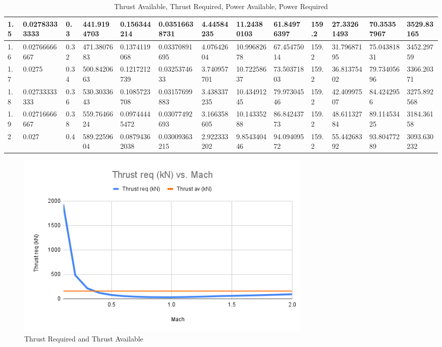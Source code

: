 \documentclass[12pt]{report}
\begin{document}
\begin{table}[H]
{\begin{tabular}{|l|l|l|l|l|l|l|l|l|l|l|l|l|}
1.5 & 0.02783333333 & 0.3  & 441.9194703 & 0.156344214   & 0.03516638731 & 4.44584235   & 11.24380103   & 61.84976397 & 159.2 & 27.33261493 & 70.35357967 & 3529.83165  \\ \hline
1.6 & 0.02766666667 & 0.32 & 471.3807683 & 0.1374119068  & 0.03370891695 & 4.07642604   & 10.99682678   & 67.45475014 & 159.2 & 31.79687195 & 75.04381831 & 3452.29759  \\ \hline
1.7 & 0.0275        & 0.34 & 500.8420663 & 0.1217212739  & 0.0325374633  & 3.740957701  & 10.72258637   & 73.50371803 & 159.2 & 36.81375402 & 79.73405696 & 3366.20371  \\ \hline
1.8 & 0.02733333333 & 0.36 & 530.3033643 & 0.1085723708  & 0.03157699883 & 3.438337235  & 10.43491245   & 79.97304546 & 159.2 & 42.40997507 & 84.4242956  & 3275.892568 \\ \hline
1.9 & 0.02716666667 & 0.38 & 559.7646624 & 0.09744445472 & 0.03077492693 & 3.166358605  & 10.14335288   & 86.84243773 & 159.2 & 48.61132784 & 89.11453425 & 3184.36158  \\ \hline
2   & 0.027         & 0.4  & 589.2259604 & 0.08794362038 & 0.03009363215 & 2.922333202  & 9.854340446   & 94.09409572 & 159.2 & 55.44268392 & 93.80477289 & 3093.630232 \\ \hline
\end{tabular}%
}
\caption{Thrust Available, Thrust Required, Power Available, Power Required}
\label{tab:my-table}
\end{table}


\begin{figure}[H]
    \centering
    \includegraphics[width=14.5cm]{Thrust req (kN) vs. Mach (1).png}
    \caption{Thrust Required and Thrust Available}
    \label{fig:enter-Thrust Required and Thrust Available}
\end{figure}
\end{document}
